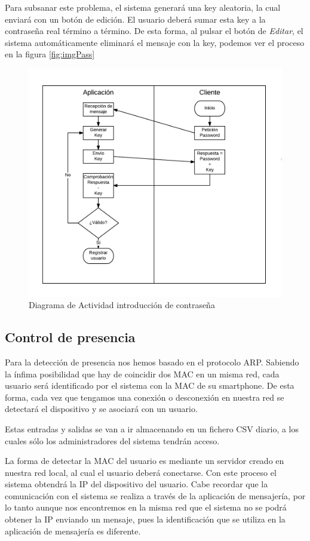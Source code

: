 \documentclass[10pt,journal,compsoc]{IEEEtran}
\begin{document}
Para subsanar este problema, el sistema generará una key aleatoria, la cual enviará con un 
botón de edición. El usuario deberá sumar esta key a la contraseña real término a término.
De esta forma, al pulsar el botón de \textit{Editar}, el sistema automáticamente eliminará el 
mensaje con la key, podemos ver el proceso en la figura \ref{fig:imgPass}

\begin{figure}[h]
\centering
\includegraphics[scale=0.5]{ActPass}
\caption{Diagrama de Actividad introducción de contraseña}
\label{fig:ActPass}
\end{figure}

\subsection{Control de presencia}
Para la detección de presencia nos hemos basado en el protocolo ARP. Sabiendo la 
ínfima posibilidad que hay de coincidir dos MAC en un misma red, cada usuario 
será identificado por el sistema con la MAC de su smartphone. De esta forma, 
cada vez que tengamos una conexión o desconexión en nuestra red se detectará el 
dispositivo y se asociará con un usuario.

Estas entradas y salidas se van a ir almacenando en un fichero CSV diario, a los 
cuales sólo los administradores del sistema tendrán acceso. 

La forma de detectar la MAC del usuario es mediante un servidor creado en 
nuestra red local, al cual el usuario deberá conectarse. Con este proceso el 
sistema obtendrá la IP del dispositivo del usuario. 
Cabe recordar que la comunicación con el sistema se realiza a través de la 
aplicación de mensajería, por lo tanto aunque nos encontremos en la misma red 
que el sistema no se podrá obtener la IP enviando un mensaje, pues la 
identificación que se utiliza en la aplicación de mensajería es diferente.
\end{document}
